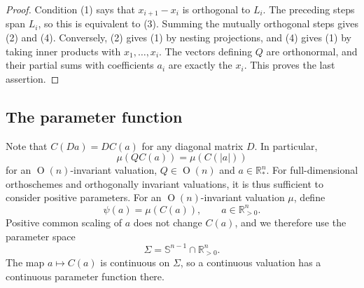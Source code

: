 \documentclass[11pt]{article}
\newcommand{\R}{\mathbb{R}}
\newcommand{\On}[1]{\operatorname{O}(#1)}
\newcommand{\sphere}[1]{\mathbb{S}^{#1}}
\newcommand{\lin}{\operatorname{lin}}
\begin{document}
\begin{proof}
Condition (1) says that $x_{i+1}-x_i$ is orthogonal to $L_i$.
The preceding steps span $L_i$, so this is equivalent to (3).
Summing the mutually orthogonal steps gives (2) and (4).
Conversely, (2) gives (1) by nesting projections, and (4) gives (1)
by taking inner products with $x_1,\ldots,x_i$.
The vectors defining $Q$ are orthonormal, and their partial sums with
coefficients $a_i$ are exactly the $x_i$. This proves the last assertion.
\end{proof}


\subsection{The parameter function}
Note that $C(Da)=DC(a)$ for any diagonal matrix $D$. In particular,
\begin{equation}\label{eq:orthoscheme-evenness}
 \mu(QC(a))=\mu(C(|a|))
\end{equation}
for an $\On n$-invariant valuation, $Q\in\On n$ and $a\in\R_*^n$. For full-dimensional orthoschemes and orthogonally invariant valuations,
it is thus sufficient to consider positive parameters. 
For an $\On n$-invariant valuation $\mu$, define
\begin{equation}\label{eq:psi}
 \psi(a)=\mu(C(a)),\qquad a\in \R_{>0}^n.
\end{equation}
Positive common scaling of $a$ does not change $C(a)$, and we therefore use the parameter space
\begin{equation}\label{eq:parameter-chamber}
 \Sigma=\sphere{n-1}\cap\R_{>0}^n.
\end{equation}
The map $a\mapsto C(a)$ is continuous on $\Sigma$, so a continuous valuation has a 
continuous parameter function there.
\end{document}
